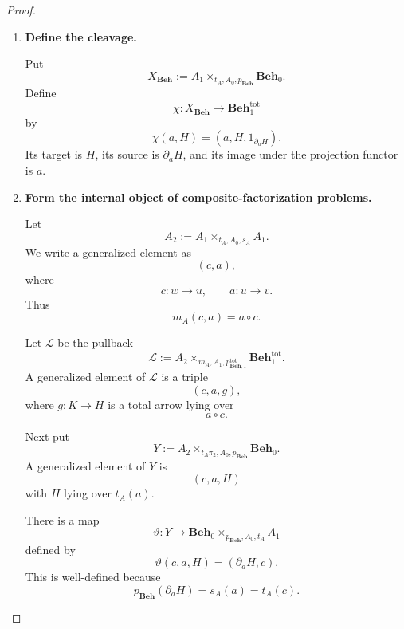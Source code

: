 \begin{proof}
\begin{enumerate}
        The identity total arrow at \(H\) lies over \(1_{p_{\mathbf{Beh}}H}\).
        The composite of arrows over \(a\) and \(b\) lies over \(b\circ a\).
        Therefore
        \[
            \pi_{\mathbf{Beh}}
        \]
        preserves identities and composition.

        \item \textbf{Define the cleavage.}

        Put
        \[
            X_{\mathbf{Beh}}
            :=
            A_1
            \times_{t_A,A_0,p_{\mathbf{Beh}}}
            \mathbf{Beh}_0.
        \]
        Define
        \[
            \chi:
            X_{\mathbf{Beh}}
            \to
            \mathbf{Beh}^{\mathrm{tot}}_1
        \]
        by
        \[
            \chi(a,H)
            =
            (a,H,1_{\partial_aH}).
        \]
        Its target is \(H\), its source is \(\partial_aH\), and its image
        under the projection functor is \(a\).

        \item \textbf{Form the internal object of composite-factorization
        problems.}

        Let
        \[
            A_2
            :=
            A_1\times_{t_A,A_0,s_A}A_1.
        \]
        We write a generalized element as
        \[
            (c,a),
        \]
        where
        \[
            c:w\to u,
            \qquad
            a:u\to v.
        \]
        Thus
        \[
            m_A(c,a)=a\circ c.
        \]

        Let \(\mathcal L\) be the pullback
        \[
            \mathcal L
            :=
            A_2
            \times_{m_A,A_1,p_{\mathbf{Beh},1}^{\mathrm{tot}}}
            \mathbf{Beh}^{\mathrm{tot}}_1.
        \]
        A generalized element of \(\mathcal L\) is a triple
        \[
            (c,a,g),
        \]
        where \(g:K\to H\) is a total arrow lying over
        \[
            a\circ c.
        \]

        Next put
        \[
            Y
            :=
            A_2
            \times_{t_A\pi_2,A_0,p_{\mathbf{Beh}}}
            \mathbf{Beh}_0.
        \]
        A generalized element of \(Y\) is
        \[
            (c,a,H)
        \]
        with \(H\) lying over \(t_A(a)\).

        There is a map
        \[
            \vartheta:
            Y
            \to
            \mathbf{Beh}_0
            \times_{p_{\mathbf{Beh}},A_0,t_A}
            A_1
        \]
        defined by
        \[
            \vartheta(c,a,H)
            =
            (\partial_aH,c).
        \]
        This is well-defined because
        \[
            p_{\mathbf{Beh}}(\partial_aH)
            =
            s_A(a)
            =
            t_A(c).
        \]


\end{enumerate}
\end{proof}
